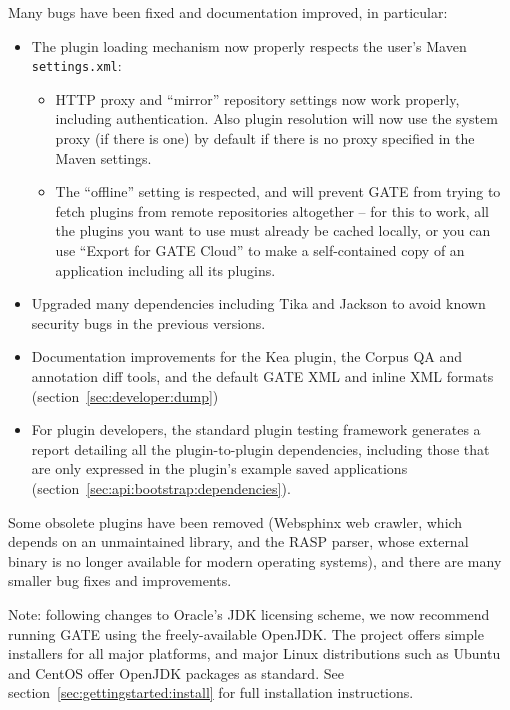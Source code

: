 Many bugs have been fixed and documentation improved, in particular:

\begin{itemize}
\item The plugin loading mechanism now properly respects the user's Maven
  \verb!settings.xml!:
  \begin{itemize}
  \item HTTP proxy and ``mirror'' repository settings now work properly,
  including authentication.  Also plugin resolution will now use the system
  proxy (if there is one) by default if there is no proxy specified in the
  Maven settings.
  \item The ``offline'' setting is respected, and will prevent GATE from trying
  to fetch plugins from remote repositories altogether -- for this to work, all
  the plugins you want to use must already be cached locally, or you can use
  ``Export for GATE Cloud'' to make a self-contained copy of an application
  including all its plugins.
  \end{itemize}
\item Upgraded many dependencies including Tika and Jackson to avoid known
  security bugs in the previous versions.
\item Documentation improvements for the Kea plugin, the Corpus QA and
  annotation diff tools, and the default GATE XML and inline XML formats
  (section~\ref{sec:developer:dump})
\item For plugin developers, the standard plugin testing framework generates a
  report detailing all the plugin-to-plugin dependencies, including those that
  are only expressed in the plugin's example saved applications
  (section~\ref{sec:api:bootstrap:dependencies}).
\end{itemize}

Some obsolete plugins have been removed (Websphinx web crawler, which depends
on an unmaintained library, and the RASP parser, whose external binary is no
longer available for modern operating systems), and there are many smaller bug
fixes and improvements.

Note: following changes to Oracle's JDK licensing scheme, we now recommend
running GATE using the freely-available OpenJDK.  The
 project offers simple
installers for all major platforms, and major Linux distributions such as
Ubuntu and CentOS offer OpenJDK packages as standard.  See
section~\ref{sec:gettingstarted:install} for full installation instructions.

